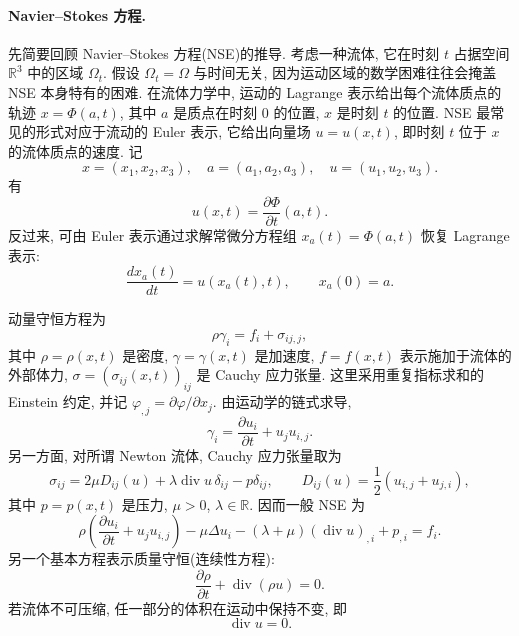 \paragraph{Navier--Stokes 方程.}
先简要回顾 Navier--Stokes 方程(NSE)的推导. 考虑一种流体, 它在时刻 $t$ 占据空间 $\mathbb R^3$ 中的区域 $\Omega_t$. 假设 $\Omega_t=\Omega$ 与时间无关, 因为运动区域的数学困难往往会掩盖 NSE 本身特有的困难. 在流体力学中, 运动的 Lagrange 表示给出每个流体质点的轨迹 $x=\Phi(a,t)$, 其中 $a$ 是质点在时刻 $0$ 的位置, $x$ 是时刻 $t$ 的位置. NSE 最常见的形式对应于流动的 Euler 表示, 它给出向量场 $u=u(x,t)$, 即时刻 $t$ 位于 $x$ 的流体质点的速度. 记
\[
x=(x_1,x_2,x_3),
\quad a=(a_1,a_2,a_3),
\quad u=(u_1,u_2,u_3).
\]
有
\[
u(x,t)=\frac{\partial\Phi}{\partial t}(a,t).
\]
反过来, 可由 Euler 表示通过求解常微分方程组 $x_a(t)=\Phi(a,t)$ 恢复 Lagrange 表示:
\begin{equation}
\frac{dx_a(t)}{dt}=u(x_a(t),t),
\qquad x_a(0)=a.
\label{eq:app3-particle-trajectory}
\end{equation}

动量守恒方程为
\[
\rho\gamma_i=f_i+\sigma_{ij,j},
\]
其中 $\rho=\rho(x,t)$ 是密度, $\gamma=\gamma(x,t)$ 是加速度, $f=f(x,t)$ 表示施加于流体的外部体力, $\sigma=(\sigma_{ij}(x,t))_{ij}$ 是 Cauchy 应力张量. 这里采用重复指标求和的 Einstein 约定, 并记 $\varphi_{,j}=\partial\varphi/\partial x_j$. 由运动学的链式求导,
\[
\gamma_i=\frac{\partial u_i}{\partial t}+u_ju_{i,j}.
\]
另一方面, 对所谓 Newton 流体, Cauchy 应力张量取为
\[
\sigma_{ij}=2\mu D_{ij}(u)+\lambda\operatorname{div}u\,\delta_{ij}-p\delta_{ij},
\qquad
D_{ij}(u)=\frac12(u_{i,j}+u_{j,i}),
\]
其中 $p=p(x,t)$ 是压力, $\mu>0$, $\lambda\in\mathbb R$. 因而一般 NSE 为
\begin{equation}
\rho\left(\frac{\partial u_i}{\partial t}+u_ju_{i,j}\right)
-\mu\Delta u_i-(\lambda+\mu)(\operatorname{div}u)_{,i}+p_{,i}=f_i.
\label{eq:app3-general-nse}
\end{equation}
另一个基本方程表示质量守恒(连续性方程):
\begin{equation}
\frac{\partial\rho}{\partial t}+\operatorname{div}(\rho u)=0.
\label{eq:app3-continuity}
\end{equation}
若流体不可压缩, 任一部分的体积在运动中保持不变, 即
\begin{equation}
\operatorname{div}u=0.
\label{eq:app3-incompressibility}
\end{equation}

